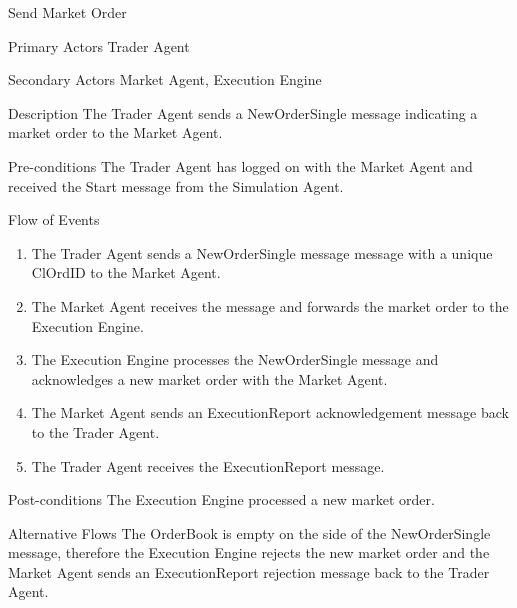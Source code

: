 \begin{usecase}{Send Market Order}
\item[Primary Actors] Trader Agent
\item[Secondary Actors] Market Agent, Execution Engine
\item[Description] The Trader Agent sends a NewOrderSingle message indicating a market order to the Market Agent.
\item[Pre-conditions] The Trader Agent has logged on with the Market Agent and received the Start message from the Simulation Agent.
\item[Flow of Events] 
\begin{enumerate}
\item The Trader Agent sends a NewOrderSingle message message with a unique ClOrdID to the Market Agent.
\item The Market Agent receives the message and forwards the market order to the Execution Engine.
\item The Execution Engine processes the NewOrderSingle message and acknowledges a new market order with the Market Agent.
\item The Market Agent sends an ExecutionReport acknowledgement message back to the Trader Agent.
\item The Trader Agent receives the ExecutionReport message.
\end{enumerate}
\item[Post-conditions] The Execution Engine processed a new market order.
\item[Alternative Flows] The OrderBook is empty on the side of the NewOrderSingle message, therefore the Execution Engine rejects the new market order and the Market Agent sends an ExecutionReport rejection message back to the Trader Agent.
\end{usecase}

